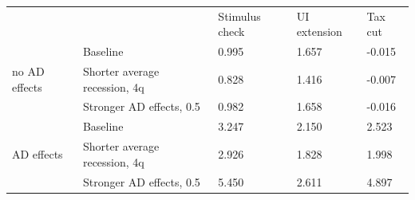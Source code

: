 \begin{tabular}{@{}lllll@{}}
\toprule
                  &                & Stimulus check & UI extension & Tax cut \\ \cmidrule(l){1-5}
    \multirow{3}{*}{no AD effects} & Baseline & 0.995 & 1.657 & -0.015 \\
                       & Shorter average recession, 4q & 0.828 & 1.416 & -0.007 \\
                       & Stronger AD effects, 0.5 & 0.982 & 1.658 & -0.016 \\ \cmidrule(l){1-5}
    \multirow{3}{*}{AD effects} & Baseline & 3.247 & 2.150 & 2.523 \\
                       & Shorter average recession, 4q & 2.926 & 1.828 & 1.998 \\
                       & Stronger AD effects, 0.5 & 5.450 & 2.611 & 4.897 \\ \cmidrule(l){1-5}
\end{tabular}

